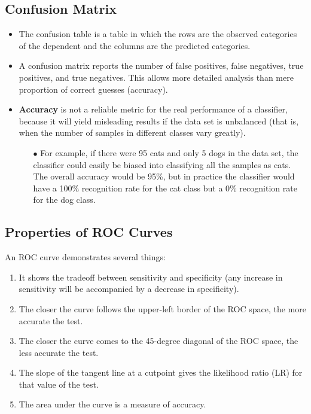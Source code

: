 \documentclass[]{report}
\begin{document}
\subsection*{Confusion Matrix}
\begin{itemize}
	\item The confusion table is a table in which the rows are the observed categories of
	the dependent and the columns are the predicted categories. 
	\item A confusion matrix reports
	the number of false positives, false negatives, true positives, and true
	negatives. This allows more detailed analysis than mere proportion of correct guesses
	(accuracy). 
	\item \textbf{Accuracy} is not a reliable metric for the real performance of a
	classifier, because it will yield misleading results if the data set is unbalanced
	(that is, when the number of samples in different classes vary greatly).
	\begin{itemize}
	\item[$\bullet$] For example, if there were 95 cats and only 5 dogs in the data set, the
	classifier could easily be biased into classifying all the samples as cats. The
	overall accuracy would be 95\%, but in practice the classifier would have a
	100\% recognition rate for the cat class but a 0\% recognition rate for the dog
	class.
\end{itemize}
\end{itemize}
\subsection{Properties of ROC Curves}
An ROC curve demonstrates several things:
\begin{enumerate}
 \item It shows the tradeoff between sensitivity and specificity (any increase in sensitivity will be accompanied by a decrease in specificity).
 \item The closer the curve follows the upper-left border of the ROC space, the more accurate the test.
 \item The closer the curve comes to the 45-degree diagonal of the ROC space, the less accurate the test.
 \item The slope of the tangent line at a cutpoint gives the likelihood ratio (LR) for that value of the test.
 \item The area under the curve is a measure of accuracy.
\end{enumerate}
\end{document}
